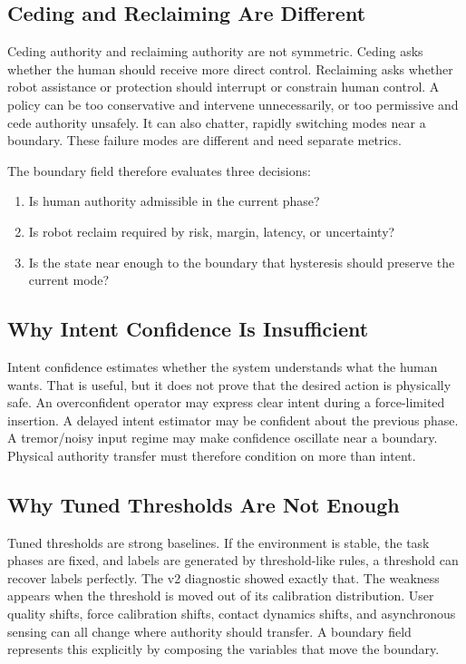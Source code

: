 \documentclass{article}
\begin{document}
\subsection{Ceding and Reclaiming Are Different}

Ceding authority and reclaiming authority are not symmetric. Ceding asks whether the human should receive more direct control. Reclaiming asks whether robot assistance or protection should interrupt or constrain human control. A policy can be too conservative and intervene unnecessarily, or too permissive and cede authority unsafely. It can also chatter, rapidly switching modes near a boundary. These failure modes are different and need separate metrics.

The boundary field therefore evaluates three decisions:
\begin{enumerate}[leftmargin=1.5em]
\item Is human authority admissible in the current phase?
\item Is robot reclaim required by risk, margin, latency, or uncertainty?
\item Is the state near enough to the boundary that hysteresis should preserve the current mode?
\end{enumerate}

\subsection{Why Intent Confidence Is Insufficient}

Intent confidence estimates whether the system understands what the human wants. That is useful, but it does not prove that the desired action is physically safe. An overconfident operator may express clear intent during a force-limited insertion. A delayed intent estimator may be confident about the previous phase. A tremor/noisy input regime may make confidence oscillate near a boundary. Physical authority transfer must therefore condition on more than intent.

\subsection{Why Tuned Thresholds Are Not Enough}

Tuned thresholds are strong baselines. If the environment is stable, the task phases are fixed, and labels are generated by threshold-like rules, a threshold can recover labels perfectly. The v2 diagnostic showed exactly that. The weakness appears when the threshold is moved out of its calibration distribution. User quality shifts, force calibration shifts, contact dynamics shifts, and asynchronous sensing can all change where authority should transfer. A boundary field represents this explicitly by composing the variables that move the boundary.
\end{document}
